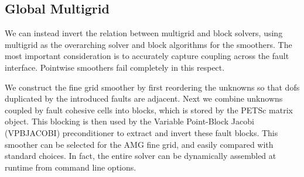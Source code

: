\documentclass[twoside,leqno,twocolumn]{article}
\begin{document}
\subsection{Global Multigrid}

We can instead invert the relation between multigrid and block solvers, using multigrid as the overarching solver and block algorithms for the smoothers. The most important consideration is to accurately capture coupling across the fault interface. Pointwise smoothers fail completely in this respect.

We construct the fine grid smoother by first reordering the unknowns so that dofs duplicated by the introduced faults are adjacent. Next we combine unknowns coupled by fault cohesive cells into blocks, which is stored by the PETSc matrix object. This blocking is then used by the Variable Point-Block Jacobi (VPBJACOBI) preconditioner to extract and invert these fault blocks. This smoother can be selected for the AMG fine grid, and easily compared with standard choices. In fact, the entire solver can be dynamically assembled at runtime from command line options.
\end{document}
